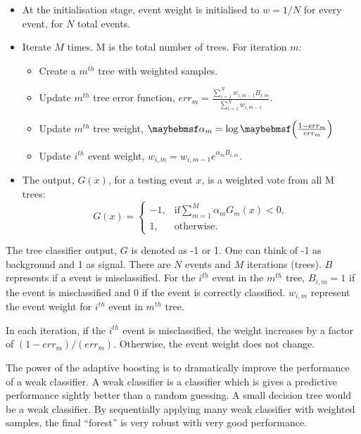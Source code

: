 \begin{itemize}
  \item At the initialisation stage,  event weight is initialised to $w = 1 / N$ for every event, for $N$ total events.
  \item Iterate $M$ times. M is the total number of trees. For iteration $m$:
    \begin{itemize}
      \item Create a $m^{th}$ tree  with weighted samples.
      \item Update $m^{th}$ tree error function, $err_m = \frac{\sum_{i = 1}^{N} w_{i,m-1} B_{i,m} }{\sum_{i = 1}^{N}w_{i,m-1}}$.
      \item Update $m^{th}$ tree weight,  $\alpha_m = \log\parenths{\frac{1 - err_m}{err_m}}$
      \item Update $i^{th}$ event weight, $w_{i,m} = w_{i,m-1} e^{\alpha_m B_{i,m} }$.
    \end{itemize}
  \item The output, $G(x)$, for a testing event $x$, is a weighted vote from all M trees:
  \begin{equation}
    G(x)=
     \begin{cases}
      -1, & \mbox{if} \sum_{m=1}^{M}\alpha_mG_m(x) < 0 , \\
      1, & \mbox{otherwise}.
    \end{cases}
  \end{equation}
\end{itemize}
The tree classifier output, $G$ is denoted as  -1 or 1. One can think of -1 as background and 1 as signal. There are $N$ events and $M$ iterations (trees). $B$ represents if a event is misclassified. For the $i^{th}$ event in the  $m^{th}$ tree,  $B_{i,m} = 1$ if the event is misclassified and 0 if the event is correctly classified. $w_{i,m}$ represent the event weight for $i^{th}$ event  in $m^{th}$ tree.


In each iteration, if the $i^{th}$ event is misclassified, the weight increases by a factor of $(1 - err_m)/(err_m)$. Otherwise, the event weight does not change.

The power of the adaptive boosting  is to dramatically improve the performance of a weak classifier. A weak classifier is a classifier which is gives a predictive performance sightly better than a random guessing. A small decision tree would be a weak classifier. By sequentially applying many weak classifier with weighted samples, the final ``forest'' is very robust with very good performance.

